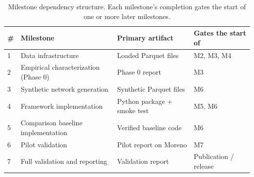 \documentclass[11pt]{article}
\begin{document}
\begin{table}[h]
\centering
\small
\begin{tabular}{p{0.7cm} p{4.5cm} p{4cm} p{3.8cm}}
\toprule
\textbf{\#} & \textbf{Milestone} & \textbf{Primary artifact} & \textbf{Gates the start of} \\
\midrule
1 & Data infrastructure & Loaded Parquet files & M2, M3, M4 \\
2 & Empirical characterization (Phase 0) & Phase 0 report & M3 \\
3 & Synthetic network generation & Synthetic Parquet files & M6 \\
4 & Framework implementation & Python package + smoke test & M5, M6 \\
5 & Comparison baseline implementation & Verified baseline code & M6 \\
6 & Pilot validation & Pilot report on Moreno & M7 \\
7 & Full validation and reporting & Validation report & Publication / release \\
\bottomrule
\end{tabular}
\caption{Milestone dependency structure. Each milestone's completion gates the start of one or more later milestones.}
\label{tab:milestones}
\end{table}



\end{document}
